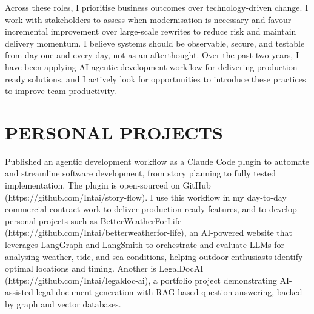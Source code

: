 \begin{resume}

Across these roles, I prioritise business outcomes over technology-driven change. I work with stakeholders to assess when modernisation is necessary and favour incremental improvement over large-scale rewrites to reduce risk and maintain delivery momentum. I believe systems should be observable, secure, and testable from day one and every day, not as an afterthought. Over the past two years, I have been applying AI agentic development workflow for delivering production-ready solutions, and I actively look for opportunities to introduce these practices to improve team productivity.

\section{PERSONAL PROJECTS} 
\vspace{0.1in}

Published an agentic development workflow as a Claude Code plugin to automate and streamline software development, from story planning to fully tested implementation. The plugin is open-sourced on GitHub (https://github.com/Intai/story-flow). I use this workflow in my day-to-day commercial contract work to deliver production-ready features, and to develop personal projects such as BetterWeatherForLife (https://github.com/Intai/betterweatherfor-life), an AI-powered website that leverages LangGraph and LangSmith to orchestrate and evaluate LLMs for analysing weather, tide, and sea conditions, helping outdoor enthusiasts identify optimal locations and timing. Another is LegalDocAI (https://github.com/Intai/legaldoc-ai), a portfolio project demonstrating AI-assisted legal document generation with RAG-based question answering, backed by graph and vector databases.


\end{resume}
